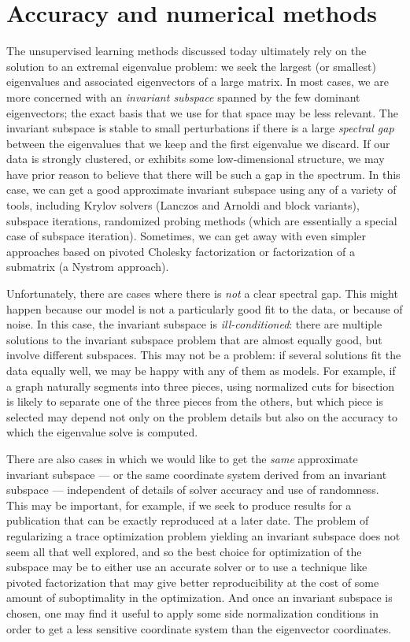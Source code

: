 \documentclass[12pt, leqno]{article} %
\begin{document}
{\section{Accuracy and numerical methods}

The unsupervised learning methods discussed today ultimately rely on
the solution to an extremal eigenvalue problem: we seek the largest
(or smallest) eigenvalues and associated eigenvectors of a large
matrix.  In most cases, we are more concerned with an {\em invariant
  subspace} spanned by the few dominant eigenvectors; the exact basis
that we use for that space may be less relevant.  The invariant
subspace is stable to small perturbations if there is a large {\em
  spectral gap} between the eigenvalues that we keep and the first
eigenvalue we discard.  If our data is strongly clustered, or exhibits
some low-dimensional structure, we may have prior reason to believe
that there will be such a gap in the spectrum.  In this case, we can
get a good approximate invariant subspace using any of a variety of
tools, including Krylov solvers (Lanczos and Arnoldi and block
variants), subspace iterations, randomized probing methods (which are
essentially a special case of subspace iteration).  Sometimes, we can
get away with even simpler approaches based on pivoted Cholesky
factorization or factorization of a submatrix (a Nystrom approach).

Unfortunately, there are cases where there is {\em not} a clear
spectral gap.  This might happen because our model is not a
particularly good fit to the data, or because of noise.  In this case,
the invariant subspace is {\em ill-conditioned}: there are multiple
solutions to the invariant subspace problem that are almost equally
good, but involve different subspaces.  This may not be a problem:
if several solutions fit the data equally well, we may be happy with
any of them as models.  For example, if a graph naturally segments
into three pieces, using normalized cuts for bisection is likely to
separate one of the three pieces from the others, but which piece is
selected may depend not only on the problem details but also on the
accuracy to which the eigenvalue solve is computed.

There are also cases in which we would like to get the {\em same}
approximate invariant subspace --- or the same coordinate system
derived from an invariant subspace --- independent of details of
solver accuracy and use of randomness.  This may be important, for
example, if we seek to produce results for a publication that can
be exactly reproduced at a later date.  The problem of regularizing a
trace optimization problem yielding an invariant subspace does not
seem all that well explored, and so the best choice for optimization
of the subspace may be to either use an accurate solver or to use
a technique like pivoted factorization that may give better
reproducibility at the cost of some amount of suboptimality in the
optimization.  And once an invariant subspace is chosen, one may find it
useful to apply some side normalization conditions in order to get a
less sensitive coordinate system than the eigenvector coordinates.

}
\end{document}
